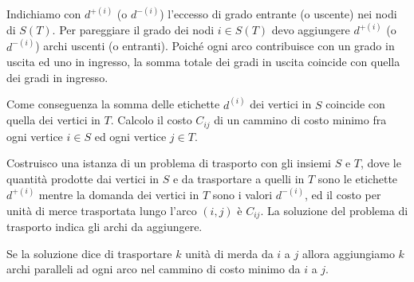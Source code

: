 \documentclass[\main/main.tex]{subfiles}
\begin{document}
Indichiamo con \(d^{+(i)}\) (o \(d^{-(i)}\)) l'eccesso di grado entrante (o uscente) nei nodi di \(S(T)\). Per pareggiare il grado dei nodi \(i \in S(T)\) devo aggiungere \(d^{+(i)}\) (o \(d^{-(i)}\)) archi uscenti (o entranti). Poiché ogni arco contribuisce con un grado in uscita ed uno in ingresso, la somma totale dei gradi in uscita coincide con quella dei gradi in ingresso.

Come conseguenza la somma delle etichette \(d^{(i)}\) dei vertici in \(S\) coincide con quella dei vertici in \(T\). Calcolo il costo \(C_{ij}\) di un cammino di costo minimo fra ogni vertice \(i \in S\) ed ogni vertice \(j \in T\).

Costruisco una istanza di un problema di trasporto con gli insiemi \(S\) e \(T\), dove le quantità prodotte dai vertici in \(S\) e da trasportare a quelli in \(T\) sono le etichette \(d^{+(i)}\) mentre la domanda dei vertici in \(T\) sono i valori \(d^{-(i)}\), ed il costo per unità di merce trasportata lungo l'arco \((i,j)\) è \(C_{ij}\). La soluzione del problema di trasporto indica gli archi da aggiungere.

Se la soluzione dice di trasportare \(k\) unità di merda da \(i\) a \(j\) allora aggiungiamo \(k\) archi paralleli ad ogni arco nel cammino di costo minimo da \(i\) a \(j\).
\end{document}
